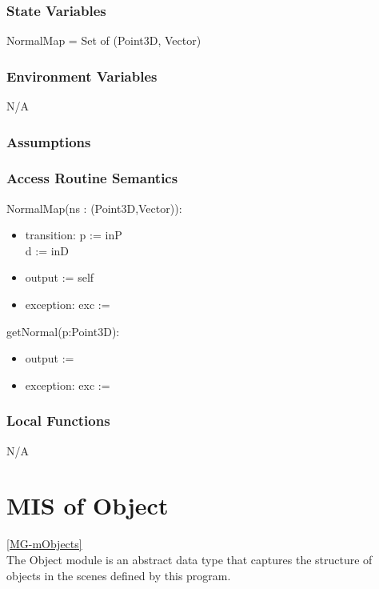 \documentclass[12pt, titlepage]{article}
\begin{document}
\subsubsection{State Variables}
NormalMap = Set of (Point3D, Vector)

\subsubsection{Environment Variables}
N/A

\subsubsection{Assumptions}


\subsubsection{Access Routine Semantics}
\noindent NormalMap(ns : (Point3D,Vector)):
\begin{itemize}
	\item transition: p := inP \\
	d := inD
	\item output := self
	\item exception: exc :=
\end{itemize}

\noindent getNormal(p:Point3D):
\begin{itemize}
	\item output := 
	\item exception: exc :=
\end{itemize}


\subsubsection{Local Functions}
N/A

\newpage

\section{MIS of Object} \ref{MG-mObjects} \\
The Object module is an abstract data type that captures the structure of 
objects in the scenes defined by this program.
\end{document}
